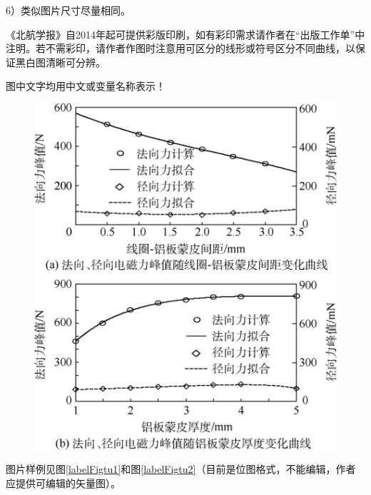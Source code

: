 \documentclass[10.5pt,twocolumn]{jbuaa}
\begin{document}
6）类似图片尺寸尽量相同。

《北航学报》自2014年起可提供彩版印刷，如有彩印需求请作者在“出版工作单”中注明。若不需彩印，请作者作图时注意用可区分的线形或符号区分不同曲线，以保证黑白图清晰可分辨。 

图中文字均用中文或变量名称表示！
\begin{figure}[b!]
\centering
\includegraphics [scale=1,trim=0 0 0 0]{./image/tu1.png}
\end{figure}

图片样例见图\ref{labelFigtu1}和图\ref{labelFigtu2}（目前是位图格式，不能编辑，作者应提供可编辑的矢量图）。
\end{document}
